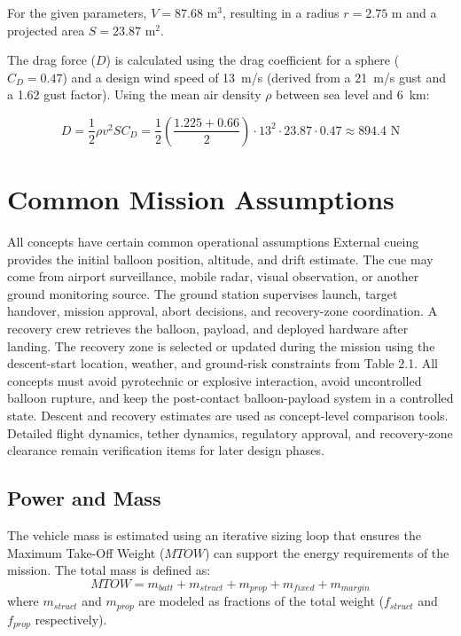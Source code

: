 For the given parameters, $V = 87.68\text{ m}^3$, resulting in a radius $r = 2.75\text{ m}$ and a projected area $S = 23.87\text{ m}^2$. 

The drag force ($D$) is calculated using the drag coefficient for a sphere ($C_D = 0.47$) and a design wind speed of 13~m/s (derived from a 21~m/s gust and a 1.62 gust factor). Using the mean air density $\rho$ between sea level and 6~km:

\begin{equation}
    D = \frac{1}{2} \rho v^2 S C_D = \frac{1}{2} \left( \frac{1.225 + 0.66}{2} \right) \cdot 13^2 \cdot 23.87 \cdot 0.47 \approx 894.4\text{ N}
\end{equation}


\section{Common Mission Assumptions}
\label{sec:common_mission_assumptions}
All concepts have certain common operational assumptions
External cueing provides the initial balloon position, altitude, and drift estimate. The cue may
come from airport surveillance, mobile radar, visual observation, or another ground monitoring
source.
The ground station supervises launch, target handover, mission approval, abort decisions, and
recovery-zone coordination. A recovery crew retrieves the balloon, payload, and deployed
hardware after landing. The recovery zone is selected or updated during the mission using the
descent-start location, weather, and ground-risk constraints from Table 2.1.
All concepts must avoid pyrotechnic or explosive interaction, avoid uncontrolled balloon rupture,
and keep the post-contact balloon-payload system in a controlled state. Descent and recovery
estimates are used as concept-level comparison tools. Detailed flight dynamics, tether dynamics,
regulatory approval, and recovery-zone clearance remain verification items for later design
phases.




\subsection*{Power and Mass}
\label{sec:power_mass}

The vehicle mass is estimated using an iterative sizing loop that ensures the Maximum Take-Off Weight ($MTOW$) can support the energy requirements of the mission. The total mass is defined as:
\begin{equation}
    MTOW = m_{batt} + m_{struct} + m_{prop} + m_{fixed} + m_{margin}
\end{equation}
where $m_{struct}$ and $m_{prop}$ are modeled as fractions of the total weight ($f_{struct}$ and $f_{prop}$ respectively). 


